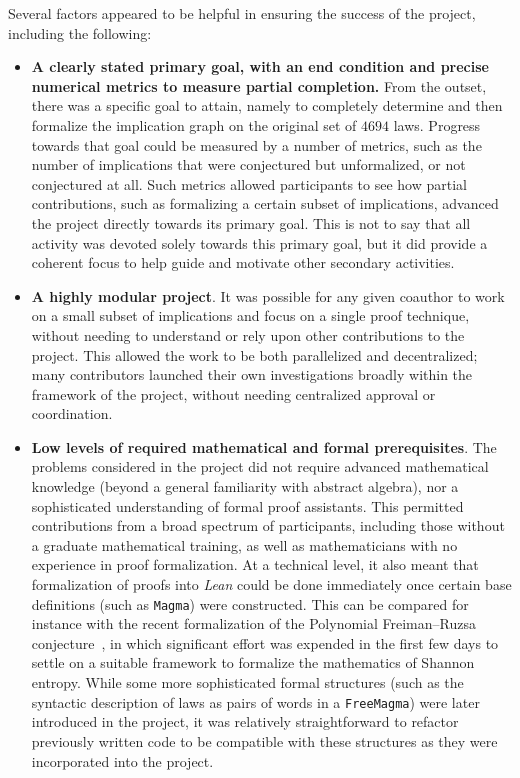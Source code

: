 \documentclass[12pt]{amsart}
\theoremstyle{definition}
\begin{document}
Several factors appeared to be helpful in ensuring the success of the project, including the following:
\begin{itemize}
\item \textbf{A clearly stated primary goal, with an end condition and precise numerical metrics to measure partial completion.}  From the outset, there was a specific goal to attain, namely to completely determine and then formalize the implication graph on the original set of $4694$ laws.  Progress towards that goal could be measured by a number of metrics, such as the number of implications that were conjectured but unformalized, or not conjectured at all.   Such metrics allowed participants to see how partial contributions, such as formalizing a certain subset of implications, advanced the project directly towards its primary goal.  This is not to say that all activity was devoted solely towards this primary goal, but it did provide a coherent focus to help guide and motivate other secondary activities.
\item \textbf{A highly modular project}.  It was possible for any given coauthor to work on a small subset of implications and focus on a single proof technique, without needing to understand or rely upon other contributions to the project.  This allowed the work to be both parallelized and decentralized; many contributors launched their own investigations broadly within the framework of the project, without needing centralized approval or coordination.
\item \textbf{Low levels of required mathematical and formal prerequisites}.  The problems considered in the project did not require advanced mathematical knowledge (beyond a general familiarity with abstract algebra), nor a sophisticated understanding of formal proof assistants.  This permitted contributions from a broad spectrum of participants, including those without a graduate mathematical training, as well as mathematicians with no experience in proof formalization.  At a technical level, it also meant that formalization of proofs into \emph{Lean} could be done immediately once certain base definitions (such as \texttt{Magma}) were constructed.  This can be compared for instance with the recent formalization of the Polynomial Freiman--Ruzsa conjecture~\cite{PFR_Tao_Dilles_2023}, in which significant effort was expended in the first few days to settle on a suitable framework to formalize the mathematics of Shannon entropy.  While some more sophisticated formal structures (such as the syntactic description of laws as pairs of words in a \texttt{FreeMagma}) were later introduced in the project, it was relatively straightforward to refactor previously written code to be compatible with these structures as they were incorporated into the project.

\end{itemize}
\end{document}
